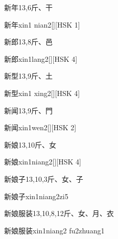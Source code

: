 \begin{entry}{新年}{13,6}{⽄、⼲}
  \begin{phonetics}{新年}{xin1 nian2}[][HSK 1]
  \end{phonetics}
\end{entry}

\begin{entry}{新郎}{13,8}{⽄、⾢}
  \begin{phonetics}{新郎}{xin1lang2}[][HSK 4]
  \end{phonetics}
\end{entry}

\begin{entry}{新型}{13,9}{⽄、⼟}
  \begin{phonetics}{新型}{xin1 xing2}[][HSK 4]
  \end{phonetics}
\end{entry}

\begin{entry}{新闻}{13,9}{⽄、⾨}
  \begin{phonetics}{新闻}{xin1wen2}[][HSK 2]
  \end{phonetics}
\end{entry}

\begin{entry}{新娘}{13,10}{⽄、⼥}
  \begin{phonetics}{新娘}{xin1niang2}[][HSK 4]
  \end{phonetics}
\end{entry}

\begin{entry}{新娘子}{13,10,3}{⽄、⼥、⼦}
  \begin{phonetics}{新娘子}{xin1niang2zi5}
  \end{phonetics}
\end{entry}

\begin{entry}{新娘服装}{13,10,8,12}{⽄、⼥、⽉、⾐}
  \begin{phonetics}{新娘服装}{xin1niang2 fu2zhuang1}
  \end{phonetics}
\end{entry}

